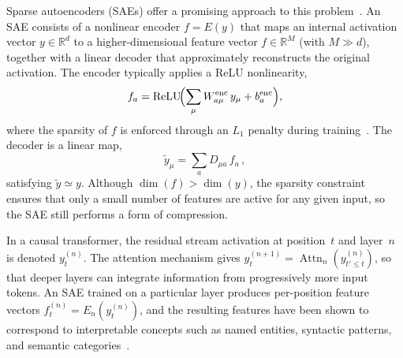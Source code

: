 \documentclass{article}
\begin{document}
Sparse autoencoders (SAEs) offer a promising approach to this
problem~\citep{yun2021transformer, cunningham2023sparse,
    bricken2023monosemanticity, templeton2024scaling}. An SAE consists of a
nonlinear encoder $f = E(y)$ that maps an internal activation vector
$y \in \mathbb{R}^d$ to a higher-dimensional feature vector
$f \in \mathbb{R}^M$ (with $M \gg d$), together with a linear decoder
that approximately reconstructs the original activation. The encoder
typically applies a ReLU nonlinearity,
\begin{equation}
    \label{eq:encoder}
    f_a = \operatorname{ReLU}\!\Bigl(\sum_{\mu} W^{\mathrm{enc}}_{a\mu}\, y_\mu + b^{\mathrm{enc}}_a
    \Bigr),
\end{equation}
where the sparsity of $f$ is enforced through an $L_1$ penalty during
training~\citep{ranzato2007sparse, ng2011sparse}. The decoder is a linear
map,
\begin{equation}
    \label{eq:decoder}
    \tilde{y}_\mu = \sum_a D_{\mu a}\, f_a\,,
\end{equation}
satisfying $\tilde{y} \simeq y$. Although $\dim(f) > \dim(y)$, the
sparsity constraint ensures that only a small number of features are active
for any given input, so the SAE still performs a form of compression.

In a causal transformer, the residual stream activation at position~$t$
and layer~$n$ is denoted $y_t^{(n)}$. The attention mechanism gives
$y_t^{(n+1)} = \operatorname{Attn}_n(y_{t' \le t}^{(n)})$,
so that deeper layers can integrate information from progressively more
input tokens. An SAE trained on a particular layer produces per-position
feature vectors $f_t^{(n)} = E_n(y_t^{(n)})$, and the resulting features
have been shown to correspond to interpretable concepts such as named
entities, syntactic patterns, and semantic
categories~\citep{bricken2023monosemanticity, templeton2024scaling}.
\end{document}
